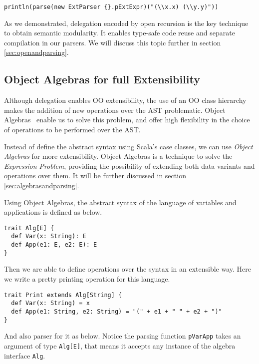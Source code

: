 \begin{lstlisting}
println(parse(new ExtParser {}.pExtExpr)("(\\x.x) (\\y.y)"))
\end{lstlisting}

As we demonstrated, delegation encoded by open recursion is the key technique to obtain semantic modularity. It enables type-safe code reuse and separate compilation in our parsers. We will discuss this topic further in section \ref{sec:openandparsing}.

\subsection{Object Algebras for full Extensibility}\label{subsec:overview-oa}

Although delegation enables OO extensibility, the use of an OO class
hierarchy makes the addition of new operations over the AST
problematic. Object Algebras~\cite{} enable us to solve this problem, and
offer high flexibility in the choice of operations to be performed
over the AST.


Instead of define the abstract syntax using Scala's case classes, we
can use \textit{Object Algebras} for more extensibility. Object
Algebras is a technique to solve the \textit{Expression Problem},
providing the possibility of extending both data variants and
operations over them. It will be further discussed in section
\ref{sec:algebrasandparsing}.

Using Object Algebras, the abstract syntax of the language of variables and applications is defined as below.

\begin{lstlisting}
trait Alg[E] {
  def Var(x: String): E
  def App(e1: E, e2: E): E
}
\end{lstlisting}

Then we are able to define operations over the syntax in an extensible way. Here we write a pretty printing operation for this language.

\begin{lstlisting}
trait Print extends Alg[String] {
  def Var(x: String) = x
  def App(e1: String, e2: String) = "(" + e1 + " " + e2 + ")"
}
\end{lstlisting}

And also parser for it as below. Notice the parsing function \lstinline{pVarApp} takes an argument of type \lstinline{Alg[E]}, that means it accepts any instance of the algebra interface \lstinline{Alg}.

